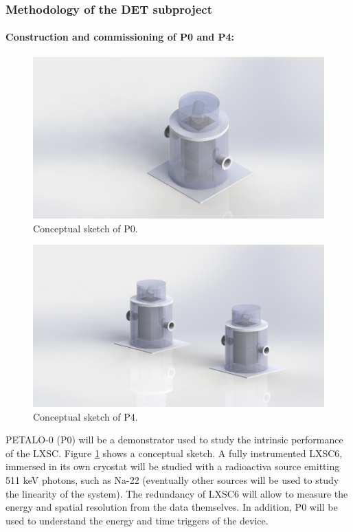 \subsubsection*{Methodology of the DET subproject}

\paragraph{Construction and commissioning of P0 and P4:}

\begin{figure}[!htb]
	\centering
	\includegraphics[scale=0.35]{img/PETALO-0.jpg}
	\caption{\label{fig.P0} Conceptual sketch of P0.  }
\end{figure}

\begin{figure}[!htb]
	\centering
	\includegraphics[scale=0.35]{img/PETALO-4.JPG}
	\caption{\label{fig.P2} Conceptual sketch of P4. }
\end{figure}

PETALO-0 (P0) will be a demonstrator used to study the intrinsic performance of the LXSC. Figure \ref{fig.P0} shows a conceptual sketch. A fully instrumented LXSC6, immersed in its own cryostat will be studied with a radioactiva source emitting 511 keV photons, such as Na-22 (eventually other sources will be used to study the linearity of the system). The redundancy of LXSC6 will allow to measure the energy and spatial resolution from the data themselves. In addition, P0 will be used to understand the energy and time triggers of the device. 

